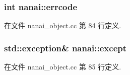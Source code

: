 \subsubsection[{errcode}]{\setlength{\rightskip}{0pt plus 5cm}int nanai\+::errcode}\label{namespacenanai_a43ed38739d33505ddadbaf7a0aad04d7}


在文件 nanai\+\_\+object.\+cc 第 84 行定义.

\hypertarget{namespacenanai_a073a964f025b092f58d6c94a775af317}{}
\subsubsection[{except}]{\setlength{\rightskip}{0pt plus 5cm}std\+::exception\& nanai\+::except}\label{namespacenanai_a073a964f025b092f58d6c94a775af317}


在文件 nanai\+\_\+object.\+cc 第 85 行定义.

